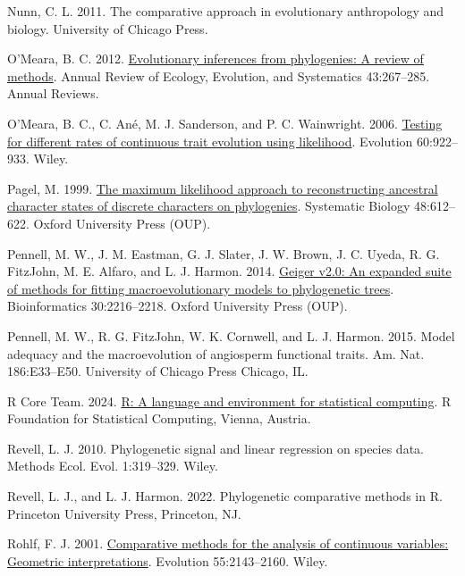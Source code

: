 \documentclass[fleqn,10pt,lineno]{wlpeerj} %
\newlength{\cslhangindent}
\newenvironment{CSLReferences}[2] %
 {\begin{list}{}{%
  \setlength{\itemindent}{0pt}
  \setlength{\leftmargin}{0pt}
  \setlength{\parsep}{0pt}
  \ifodd #1
   \setlength{\leftmargin}{\cslhangindent}
   \setlength{\itemindent}{-1\cslhangindent}
  \fi
  \setlength{\itemsep}{#2\baselineskip}}}
 {\end{list}}
\begin{document}
\begin{CSLReferences}{1}{0}
Nunn, C. L. 2011. The comparative approach in evolutionary anthropology and biology. University of Chicago Press.

O'Meara, B. C. 2012. \href{https://doi.org/10.1146/annurev-ecolsys-110411-160331}{Evolutionary inferences from phylogenies: A review of methods}. Annual Review of Ecology, Evolution, and Systematics 43:267--285. Annual Reviews.

O'Meara, B. C., C. Ané, M. J. Sanderson, and P. C. Wainwright. 2006. \href{https://doi.org/10.1111/j.0014-3820.2006.tb01171.x}{Testing for different rates of continuous trait evolution using likelihood}. Evolution 60:922--933. Wiley.

Pagel, M. 1999. \href{https://doi.org/10.1080/106351599260184}{The maximum likelihood approach to reconstructing ancestral character states of discrete characters on phylogenies}. Systematic Biology 48:612--622. Oxford University Press (OUP).

Pennell, M. W., J. M. Eastman, G. J. Slater, J. W. Brown, J. C. Uyeda, R. G. FitzJohn, M. E. Alfaro, and L. J. Harmon. 2014. \href{https://doi.org/10.1093/bioinformatics/btu181}{Geiger v2.0: An expanded suite of methods for fitting macroevolutionary models to phylogenetic trees}. Bioinformatics 30:2216--2218. Oxford University Press (OUP).

Pennell, M. W., R. G. FitzJohn, W. K. Cornwell, and L. J. Harmon. 2015. Model adequacy and the macroevolution of angiosperm functional traits. Am. Nat. 186:E33--E50. University of Chicago Press Chicago, IL.

R Core Team. 2024. \href{https://www.R-project.org/}{R: A language and environment for statistical computing}. R Foundation for Statistical Computing, Vienna, Austria.

Revell, L. J. 2010. Phylogenetic signal and linear regression on species data. Methods Ecol. Evol. 1:319--329. Wiley.

Revell, L. J., and L. J. Harmon. 2022. Phylogenetic comparative methods in {R}. Princeton University Press, Princeton, NJ.

Rohlf, F. J. 2001. \href{https://doi.org/10.1111/j.0014-3820.2001.tb00731.x}{Comparative methods for the analysis of continuous variables: Geometric interpretations}. Evolution 55:2143--2160. Wiley.


\end{CSLReferences}
\end{document}

